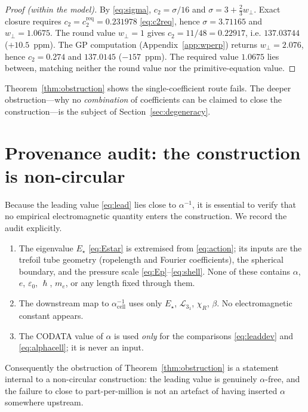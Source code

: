\documentclass[11pt,a4paper]{article}
\theoremstyle{definition}
\begin{document}
\begin{proof}[Proof (within the model)]
By \eqref{eq:sigma}, $c_2=\sigma/16$ and $\sigma=3+\tfrac23 w_\perp$. Exact
closure requires $c_2=c_2^{\mathrm{req}}=0.231978$ \eqref{eq:c2req}, hence
$\sigma=3.71165$ and $w_\perp=1.0675$. The round value $w_\perp=1$ gives
$c_2=11/48=0.22917$, i.e. $137.03744$ ($+10.5$~ppm). The GP computation
(Appendix~\ref{app:wperp}) returns $w_\perp=2.076$, hence $c_2=0.274$ and
$137.0145$ ($-157$~ppm). The required value $1.0675$ lies between, matching
neither the round value nor the primitive-equation value. \qedhere
\end{proof}

\noindent Theorem~\ref{thm:obstruction} shows the single-coefficient route fails.
The deeper obstruction---why no \emph{combination} of coefficients can be claimed
to close the construction---is the subject of Section~\ref{sec:degeneracy}.

\section{Provenance audit: the construction is non-circular}
\label{sec:provenance}

Because the leading value \eqref{eq:lead} lies close to $\alpha^{-1}$, it is
essential to verify that no empirical electromagnetic quantity enters the
construction. We record the audit explicitly.

\begin{enumerate}
\item The eigenvalue $E_\star$ \eqref{eq:Estar} is extremised from
\eqref{eq:action}; its inputs are the trefoil tube geometry (ropelength and
Fourier coefficients), the spherical boundary, and the pressure scale
\eqref{eq:Ep}--\eqref{eq:shell}. None of these contains $\alpha$, $e$,
$\varepsilon_0$, $\hslash$, $m_e$, or any length fixed through them.
\item The downstream map to $\alpha^{-1}_{\mathrm{cell}}$ uses only $E_\star$,
$\mathcal{L}_{3_1}$, $\chi_R$, $\beta$. No electromagnetic constant appears.
\item The CODATA value of $\alpha$ is used \emph{only} for the comparisons
\eqref{eq:leaddev} and \eqref{eq:alphacell}; it is never an input.
\end{enumerate}
Consequently the obstruction of Theorem~\ref{thm:obstruction} is a statement
internal to a non-circular construction: the leading value is genuinely $\alpha$-free,
and the failure to close to part-per-million is not an artefact of having inserted
$\alpha$ somewhere upstream.
\end{document}
